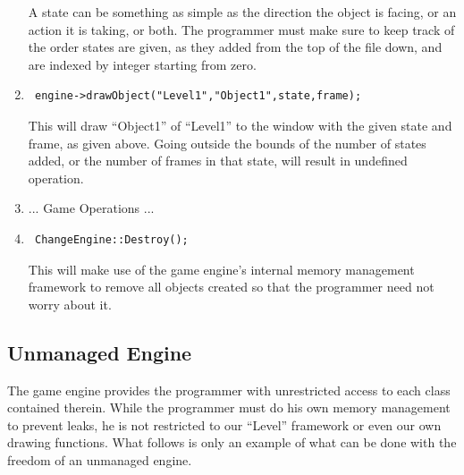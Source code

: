 \documentclass[12pt]{article}
\begin{document}
\begin{enumerate}
A state can be something as simple as the direction the object is facing, or an action it is taking, or both. The programmer must make sure to keep track of the order states are given, as they added from the top of the file down, and are indexed by integer starting from zero.
 \item \begin{verbatim} engine->drawObject("Level1","Object1",state,frame); \end{verbatim}
This will draw ``Object1'' of ``Level1'' to the window with the given state and frame, as given above. Going outside the bounds of the number of states added, or the number of frames in that state, will result in undefined operation.
 \item ... Game Operations ...
 \item \begin{verbatim} ChangeEngine::Destroy(); \end{verbatim}
This will make use of the game engine's internal memory management framework to remove all objects created so that the programmer need not worry about it.
\end{enumerate}

\subsection{Unmanaged Engine}
The game engine provides the programmer with unrestricted access to each class contained therein. While the programmer must do his own memory management to prevent leaks, he is not restricted to our ``Level'' framework or even our own drawing functions. What follows is only an example of what can be done with the freedom of an unmanaged engine.
\end{document}
